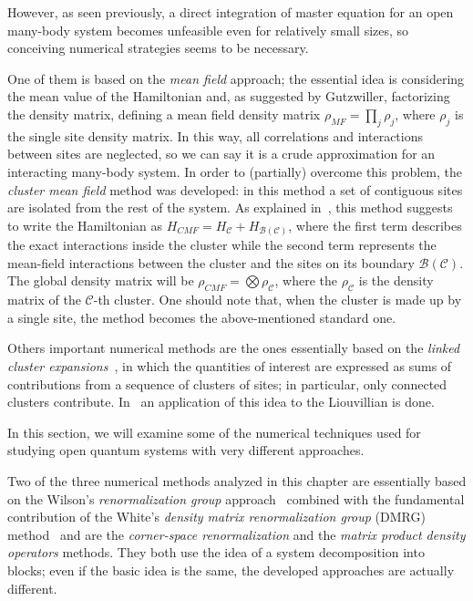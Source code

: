 However, as seen previously, a direct integration of master equation for an open many-body system becomes unfeasible even for relatively small sizes, so conceiving numerical strategies seems to be necessary.

One of them is based on the \emph{mean field} approach; the essential idea is considering the mean value of the Hamiltonian and, as suggested by Gutzwiller, factorizing the density matrix, defining a mean field density matrix $\rho_{MF} = \prod_j\rho_j$, where $\rho_j$ is the single site density matrix. In this way, all correlations and interactions between sites are neglected, so we can say it is a crude approximation for an interacting many-body system. In order to (partially) overcome this problem, the \emph{cluster mean field} method was developed: in this method a set of contiguous sites are isolated from the rest of the system. As explained in~\cite{jin_biella_ross}, this method suggests to write the Hamiltonian as $H_{CMF} = H_\mathcal{C} + H_{\mathcal{B(C)}}$, where the first term describes the exact interactions inside the cluster while the second term represents the mean-field interactions between the cluster and the sites on its boundary $\mathcal{B(C)}$. The global density matrix will be $\rho_{CMF} = \bigotimes \rho_\mathcal{C}$, where the $\rho_\mathcal{C}$ is the density matrix of the $\mathcal{C}$-th cluster. One should note that, when the cluster is made up by a single site, the method becomes the above-mentioned standard one. 

Others important numerical methods are the ones essentially based on the \emph{linked cluster expansions}~\cite{oitmaa}, in which the quantities of interest are expressed as sums of contributions from a sequence of clusters of sites; in particular, only connected clusters contribute. In~\cite{PhysRevX.6.021037} an application of this idea to the Liouvillian is done.

In this section, we will examine some of the numerical techniques used for studying open quantum systems with very different approaches.

Two of the three numerical methods analyzed in this chapter are essentially based on the Wilson's \emph{renormalization group} approach~\cite{RevModPhys.47.773} combined with the fundamental contribution of the White's \emph{density matrix renormalization group} (DMRG) method~\cite{s_white:dmrg} and are the \emph{corner-space renormalization} and the \emph{matrix product density operators} methods. They both use the idea of a system decomposition into blocks; even if the basic idea is the same, the developed approaches are actually different.

